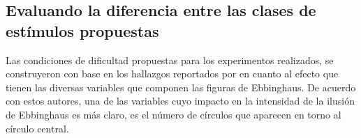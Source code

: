 \begin{itemize}

\end{itemize}








\subsection{Evaluando la diferencia entre las clases de estímulos propuestas}

Las condiciones de dificultad propuestas para los experimentos realizados, se construyeron con base en los hallazgos reportados por \parencite{Massaro1971} en cuanto al efecto que tienen las diversas variables que componen las figuras de Ebbinghaus. De acuerdo con estos autores, una de las variables cuyo impacto en la intensidad de la ilusión de Ebbinghaus es más claro, es el número de círculos que aparecen en torno al círculo central.

